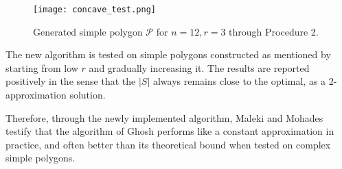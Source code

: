 \begin{figure}[h!]
    \centering
    \texttt{[image: concave\_test.png]}
    \caption{Generated simple polygon $\mathcal P$ for $n = 12, r = 3$ \cite{maleki2022implementation} through Procedure 2.}
    \label{fig:arbitrary}
\end{figure}

The new algorithm is tested on simple polygons constructed as mentioned by starting from low $r$ and gradually increasing it. The results are reported positively in the sense that the $|S|$ always remains close to the optimal, as a 2-approximation solution.

Therefore, through the newly implemented algorithm, Maleki and Mohades \cite{maleki2022implementation} testify that the algorithm of Ghosh \cite{GHOSH2010718} performs like a constant approximation in practice, and often better than its theoretical bound when tested on complex simple polygons.
